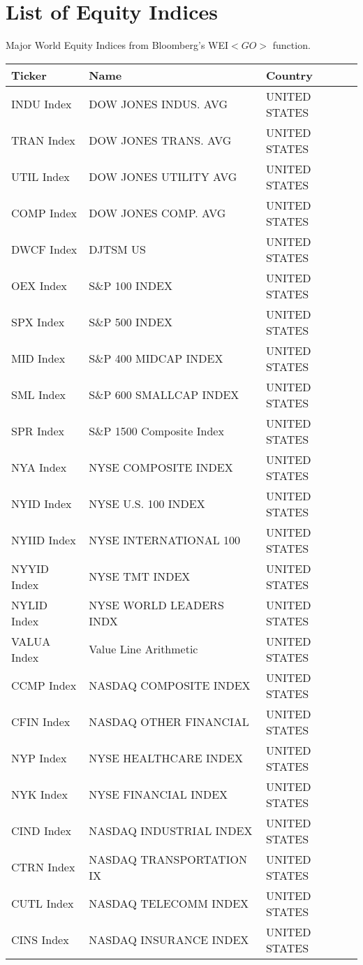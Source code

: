 \chapter{List of Equity Indices} \label{sec.B}

Major World Equity Indices from Bloomberg's WEI$<GO>$ function\cite{bloomberg}.

\begin {table}[H]
\begin{center}
\small
\hspace*{-3cm}
\begin{tabu}{| l l l |} 
\hline
Ticker & Name & Country\\
\hline
INDU Index & DOW JONES INDUS. AVG & UNITED STATES \\ 
TRAN Index & DOW JONES TRANS. AVG & UNITED STATES \\ 
UTIL Index & DOW JONES UTILITY AVG & UNITED STATES \\ 
COMP Index & DOW JONES COMP. AVG & UNITED STATES \\ 
DWCF Index & DJTSM US & UNITED STATES \\ 
OEX Index & S\&P 100 INDEX & UNITED STATES \\ 
SPX Index & S\&P 500 INDEX & UNITED STATES \\ 
MID Index & S\&P 400 MIDCAP INDEX & UNITED STATES \\ 
SML Index & S\&P 600 SMALLCAP INDEX & UNITED STATES \\ 
SPR Index & S\&P 1500 Composite Index & UNITED STATES \\ 
NYA Index & NYSE COMPOSITE INDEX & UNITED STATES \\ 
NYID Index & NYSE U.S. 100 INDEX & UNITED STATES \\ 
NYIID Index & NYSE INTERNATIONAL 100 & UNITED STATES \\ 
NYYID Index & NYSE TMT INDEX & UNITED STATES \\ 
NYLID Index & NYSE WORLD LEADERS INDX & UNITED STATES \\ 
VALUA Index & Value Line Arithmetic & UNITED STATES \\ 
CCMP Index & NASDAQ COMPOSITE INDEX & UNITED STATES \\ 
CFIN Index & NASDAQ OTHER FINANCIAL & UNITED STATES \\ 
NYP Index & NYSE HEALTHCARE INDEX & UNITED STATES \\ 
NYK Index & NYSE FINANCIAL INDEX & UNITED STATES \\ 
CIND Index & NASDAQ INDUSTRIAL INDEX & UNITED STATES \\ 
CTRN Index & NASDAQ TRANSPORTATION IX & UNITED STATES \\ 
CUTL Index & NASDAQ TELECOMM INDEX & UNITED STATES \\ 
CINS Index & NASDAQ INSURANCE INDEX & UNITED STATES \\ 

\hline
\end{tabu}
\hspace*{-3cm}
\small
\end{center}
\end{table}

